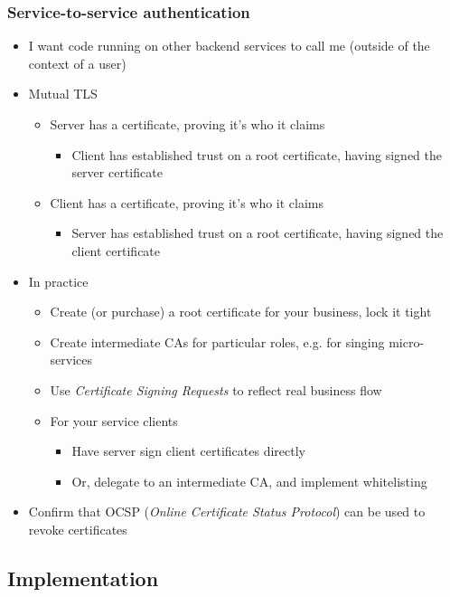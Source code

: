 \documentclass[8pt]{article}
\begin{document}
\subsubsection{Service-to-service authentication}
\label{sec:orgfdf624e}
\begin{itemize}
\item I want code running on other backend services to call me (outside of the context of a user)

\item Mutual TLS
\begin{itemize}
\item Server has a certificate, proving it's who it claims
\begin{itemize}
\item Client has established trust on a root certificate, having signed the server certificate
\end{itemize}
\item Client has a certificate, proving it's who it claims
\begin{itemize}
\item Server has established trust on a root certificate, having signed the client certificate
\end{itemize}
\end{itemize}

\item In practice
\begin{itemize}
\item Create (or purchase) a root certificate for your business, lock it tight
\item Create intermediate CAs for particular roles, e.g. for singing micro-services
\item Use \emph{Certificate Signing Requests} to reflect real business flow
\item For your service clients
\begin{itemize}
\item Have server sign client certificates directly
\item Or, delegate to an intermediate CA, and implement whitelisting
\end{itemize}
\end{itemize}
\item Confirm that OCSP (\emph{Online Certificate Status Protocol}) can be used to revoke certificates
\end{itemize}
\subsection{Implementation}
\label{sec:org06b1634}
\end{document}
